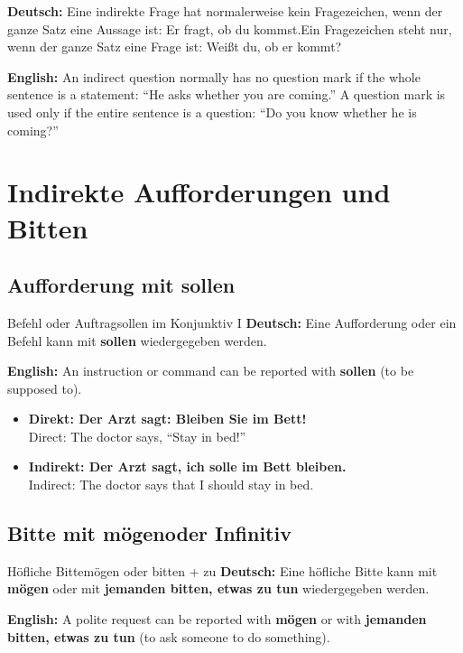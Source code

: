 \documentclass[a4paper,11pt]{article}
\newcommand{\GermanText}[1]{\textbf{Deutsch: }#1\par}
\newcommand{\EnglishText}[1]{{\small\color{SoftGray}\textbf{English: }#1\par}}
\newcommand{\ExampleItem}[2]{\item \textbf{#1}\\{\small\color{SoftGray}#2}}
\begin{document}
        \begin{warningbox}
            \GermanText{Eine indirekte Frage hat normalerweise kein Fragezeichen, wenn der ganze Satz eine Aussage ist: \glqq Er fragt, ob du kommst.\grqq Ein Fragezeichen steht nur, wenn der ganze Satz eine Frage ist: \glqq Weißt du, ob er kommt?\grqq}
            \EnglishText{An indirect question normally has no question mark if the whole sentence is a statement: ``He asks whether you are coming.'' A question mark is used only if the entire sentence is a question: ``Do you know whether he is coming?''}
        \end{warningbox}


    \section{Indirekte Aufforderungen und Bitten}

        \subsection{Aufforderung mit \glqq sollen\grqq}

            \begin{grammarentry}{Befehl oder Auftrag}{sollen im Konjunktiv I}
                \GermanText{Eine Aufforderung oder ein Befehl kann mit \textbf{sollen} wiedergegeben werden.}
                \EnglishText{An instruction or command can be reported with \textbf{sollen} (to be supposed to).}
            \end{grammarentry}

            \begin{exbox}
                \begin{itemize}
                    \ExampleItem{Direkt: Der Arzt sagt: \glqq Bleiben Sie im Bett!\grqq}{Direct: The doctor says, ``Stay in bed!''}
                    \ExampleItem{Indirekt: Der Arzt sagt, ich solle im Bett bleiben.}{Indirect: The doctor says that I should stay in bed.}
                \end{itemize}
            \end{exbox}

        \subsection{Bitte mit \glqq mögen\grqq oder Infinitiv}

            \begin{grammarentry}{Höfliche Bitte}{mögen oder bitten + zu}
                \GermanText{Eine höfliche Bitte kann mit \textbf{mögen} oder mit \textbf{jemanden bitten, etwas zu tun} wiedergegeben werden.}
                \EnglishText{A polite request can be reported with \textbf{mögen} or with \textbf{jemanden bitten, etwas zu tun} (to ask someone to do something).}
            \end{grammarentry}
\end{document}

